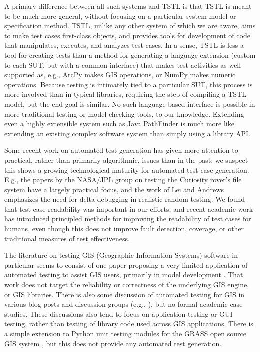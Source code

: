A primary difference between all such systems and TSTL is that TSTL is
meant to be much more general, without focusing on a particular system
model or specification method.  
TSTL, unlike any other system of which we are
aware, aims to make test cases first-class objects, and provides tools
for development of code that manipulates, executes, and analyzes test
cases.  In a sense, TSTL is less a tool for creating tests than a
method for generating a language extension (custom to each SUT, but
with a common interface) that makes test activities as well supported
as, e.g., ArcPy makes GIS operations, or NumPy makes numeric
operations.  Because testing is intimately tied to a particular SUT,
this process is more involved than in typical libraries, requiring the
step of compiling a TSTL model, but the end-goal is similar.  No such
language-based interface is possible in more traditional testing or
model checking tools, to our knowledge.  Extending even a highly
extensible system such as Java PathFinder \cite{JPF2} is much more
like extending an existing complex software system than simply using a
library API.

Some recent work on automated test generation has given more attention
to practical, rather than primarily algorithmic, issues than in the
past; we suspect this shows a growing technological maturity for
automated test case generation.  E.g., the papers by the NASA/JPL
group on testing the Curiosity rover's file system
\cite{ICSEDiff,CFV08,AMAI} have a largely practical focus, and the
work of Lei and Andrews \cite{MinUnit} emphasizes the need for
delta-debugging in realistic random testing.  We found that test case
readability was important in our efforts, and recent academic work
\cite{Readable,Guava} has introduced principled methods for improving
the readability of test cases for humans, even though this does not
improve fault detection, coverage, or other traditional measures of
test effectiveness.

The literature on testing GIS (Geographic Information Systems) software
in particular seems to consist of one paper proposing a very limited
application of automated testing to assist GIS users, primarily in
model development \cite{GISTest}.  That work does not target the
reliability or correctness of the underlying GIS engine, or GIS
libraries.  There is also some discussion of automated testing for GIS
in various blog posts and discussion groups (e.g.,
\cite{gisblog1,gisblog2}), but no formal academic case studies.  These
discussions also tend to focus on application testing or GUI testing,
rather than testing of library code used across GIS applications.
There is a simple extension to Python unit testing modules for the
GRASS open source GIS system \cite{GRASSunit}, but this does not
provide any automated test generation.

